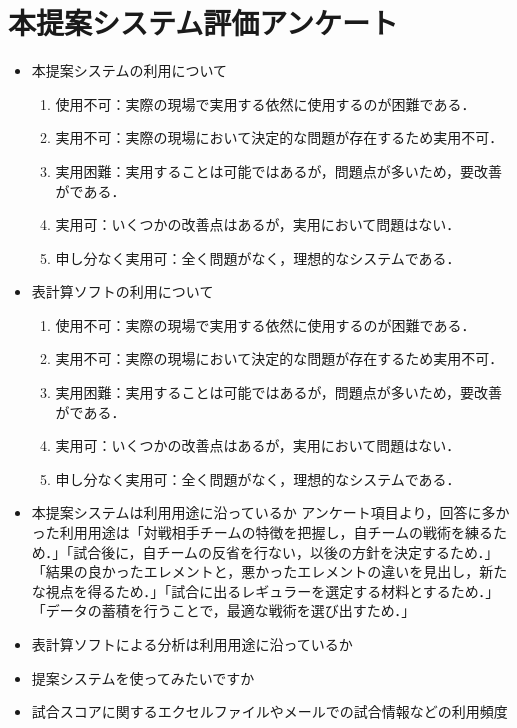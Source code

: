 \documentclass[sotsuron]{kuee}
\begin{document}
\chapter{本提案システム評価アンケート}
	\begin{itemize}
		\item 本提案システムの利用について
			\begin{enumerate}
				\item 使用不可：実際の現場で実用する依然に使用するのが困難である．
				\item 実用不可：実際の現場において決定的な問題が存在するため実用不可．
				\item 実用困難：実用することは可能ではあるが，問題点が多いため，要改善がである．
				\item 実用可：いくつかの改善点はあるが，実用において問題はない．
				\item 申し分なく実用可：全く問題がなく，理想的なシステムである．
			\end{enumerate}
		\item 表計算ソフトの利用について
			\begin{enumerate}
				\item 使用不可：実際の現場で実用する依然に使用するのが困難である．
				\item 実用不可：実際の現場において決定的な問題が存在するため実用不可．
				\item 実用困難：実用することは可能ではあるが，問題点が多いため，要改善がである．
				\item 実用可：いくつかの改善点はあるが，実用において問題はない．
				\item 申し分なく実用可：全く問題がなく，理想的なシステムである．
			\end{enumerate}
		\item 本提案システムは利用用途に沿っているか
			アンケート項目より，回答に多かった利用用途は「対戦相手チームの特徴を把握し，自チームの戦術を練るため．」「試合後に，自チームの反省を行ない，以後の方針を決定するため．」「結果の良かったエレメントと，悪かったエレメントの違いを見出し，新たな視点を得るため．」「試合に出るレギュラーを選定する材料とするため．」「データの蓄積を行うことで，最適な戦術を選び出すため．」
		\item 表計算ソフトによる分析は利用用途に沿っているか
		\item 提案システムを使ってみたいですか
		\item 試合スコアに関するエクセルファイルやメールでの試合情報などの利用頻度
	\end{itemize}


\end{document}
